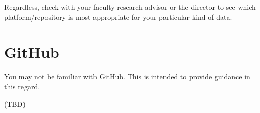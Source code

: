 \documentclass[
]{book}
\begin{document}
Regardless, check with your faculty research advisor or the director to see which platform/repository is most appropriate for your particular kind of data.

\hypertarget{github}{%
\chapter{GitHub}\label{github}}

You may not be familiar with GitHub. This is intended to provide guidance in this regard.

(TBD)

  
\end{document}
